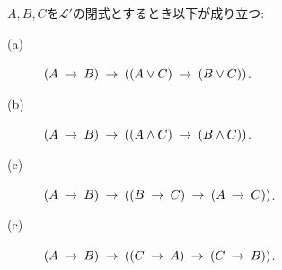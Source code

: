 	\begin{screen}
		\begin{logicalthm}[含意は遺伝する]\label{logicalthm:rule_of_inference_1}
			$A,B,C$を$\mathcal{L}'$の閉式とするとき以下が成り立つ:
			\begin{description}
				\item[(a)] $(A \rarrow B) \rarrow ( (A \vee C) \rarrow (B \vee C) )$.
				
				\item[(b)] $(A \rarrow B) \rarrow ( (A \wedge C) \rarrow (B \wedge C) )$.
				
				\item[(c)] $(A \rarrow B) \rarrow ( (B \rarrow C) \rarrow (A \rarrow C) )$.
				
				\item[(c)] $(A \rarrow B) \rarrow ( (C \rarrow A) \rarrow (C \rarrow B) )$.
			\end{description}
		\end{logicalthm}
	\end{screen}
	
